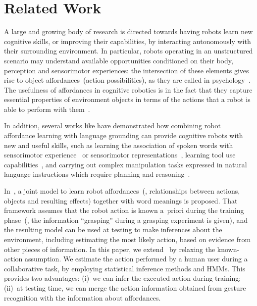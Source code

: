 
\section{Related Work}

A large and growing body of research is directed towards having robots learn new cognitive skills, or improving their capabilities, by interacting autonomously with their surrounding environment. In particular, robots operating in an unstructured scenario may understand available opportunities conditioned on their body, perception and sensorimotor experiences: the intersection of these elements gives rise to object affordances~(action possibilities), as they are called in psychology~\cite{gibson:2014}. The usefulness of affordances in cognitive robotics is in the fact that they capture essential properties of environment objects in terms of the actions that a robot is able to perform with them~\cite{montesano:2008,jamone:2016:tcds}.

In addition, several works like have demonstrated how combining robot affordance learning with language grounding can provide cognitive robots with new and useful skills, such as learning the association of spoken words with sensorimotor experience~\cite{salvi:2012:smcb} or sensorimotor representations~\cite{stramandinoli:2016:icdl}, learning tool use capabilities~\cite{goncalves:2014:icarsc,goncalves:2014:icdl}, and carrying out complex manipulation tasks expressed in natural language instructions which require planning and reasoning~\cite{antunes:2016:icra}.

In~\cite{salvi:2012:smcb}, a joint model to learn robot affordances~(\ie, relationships between actions, objects and resulting effects) together with word meanings is proposed. That framework assumes that the robot action is known a~priori during the training phase~(\eg, the information ``grasping'' during a grasping experiment is given), and the resulting model can be used at testing to make inferences about the environment, including estimating the most likely action, based on evidence from other pieces of information. In this paper, we extend~\cite{salvi:2012:smcb} by relaxing the known-action assumption. We estimate the action performed by a human user during a \hr{} collaborative task, by employing statistical inference methods and \acp{HMM}. This provides two advantages: (i)~we can infer the executed action during training; (ii)~at testing time, we can merge the action information obtained from gesture recognition with the information about affordances.


